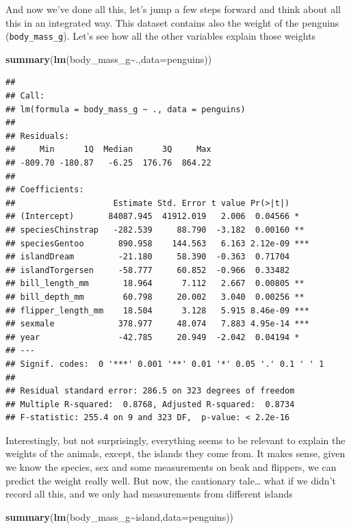 \documentclass[
]{book}
\newenvironment{Shaded}{\begin{snugshade}}{\end{snugshade}}
\newcommand{\AttributeTok}[1]{\textcolor[rgb]{0.13,0.29,0.53}{#1}}
\newcommand{\FunctionTok}[1]{\textcolor[rgb]{0.13,0.29,0.53}{\textbf{#1}}}
\newcommand{\NormalTok}[1]{#1}
\newcommand{\SpecialCharTok}[1]{\textcolor[rgb]{0.81,0.36,0.00}{\textbf{#1}}}
\begin{document}
And now we've done all this, let's jump a few steps forward and think about all this in an integrated way. This dataset contains also the weight of the penguins (\texttt{body\_mass\_g}). Let's see how all the other variables explain those weights

\begin{Shaded}
\begin{Highlighting}[]
\FunctionTok{summary}\NormalTok{(}\FunctionTok{lm}\NormalTok{(body\_mass\_g}\SpecialCharTok{\textasciitilde{}}\NormalTok{.,}\AttributeTok{data=}\NormalTok{penguins))}
\end{Highlighting}
\end{Shaded}

\begin{verbatim}
## 
## Call:
## lm(formula = body_mass_g ~ ., data = penguins)
## 
## Residuals:
##     Min      1Q  Median      3Q     Max 
## -809.70 -180.87   -6.25  176.76  864.22 
## 
## Coefficients:
##                    Estimate Std. Error t value Pr(>|t|)    
## (Intercept)       84087.945  41912.019   2.006  0.04566 *  
## speciesChinstrap   -282.539     88.790  -3.182  0.00160 ** 
## speciesGentoo       890.958    144.563   6.163 2.12e-09 ***
## islandDream         -21.180     58.390  -0.363  0.71704    
## islandTorgersen     -58.777     60.852  -0.966  0.33482    
## bill_length_mm       18.964      7.112   2.667  0.00805 ** 
## bill_depth_mm        60.798     20.002   3.040  0.00256 ** 
## flipper_length_mm    18.504      3.128   5.915 8.46e-09 ***
## sexmale             378.977     48.074   7.883 4.95e-14 ***
## year                -42.785     20.949  -2.042  0.04194 *  
## ---
## Signif. codes:  0 '***' 0.001 '**' 0.01 '*' 0.05 '.' 0.1 ' ' 1
## 
## Residual standard error: 286.5 on 323 degrees of freedom
## Multiple R-squared:  0.8768, Adjusted R-squared:  0.8734 
## F-statistic: 255.4 on 9 and 323 DF,  p-value: < 2.2e-16
\end{verbatim}

Interestingly, but not surprisingly, everything seems to be relevant to explain the weights of the animals, except, the islands they come from. It makes sense, given we know the species, sex and some measurements on beak and flippers, we can predict the weight really well. But now, the cautionary tale\ldots{} what if we didn't record all this, and we only had measurements from different islands

\begin{Shaded}
\begin{Highlighting}[]
\FunctionTok{summary}\NormalTok{(}\FunctionTok{lm}\NormalTok{(body\_mass\_g}\SpecialCharTok{\textasciitilde{}}\NormalTok{island,}\AttributeTok{data=}\NormalTok{penguins))}
\end{Highlighting}
\end{Shaded}
\end{document}
